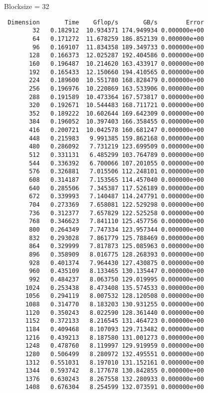 \documentclass{article}
\begin{document}
\begin{enumerate}
    Blocksize = 32
    \begin{verbatim}
 Dimension       Time    Gflop/s       GB/s        Error
        32   0.182912  10.934371 174.949934 0.000000e+00
        64   0.171272  11.678259 186.852139 0.000000e+00
        96   0.169107  11.834358 189.349733 0.000000e+00
       128   0.166373  12.025287 192.404586 0.000000e+00
       160   0.196487  10.214620 163.433917 0.000000e+00
       192   0.165433  12.150660 194.410565 0.000000e+00
       224   0.189600  10.551780 168.828479 0.000000e+00
       256   0.196976  10.220869 163.533906 0.000000e+00
       288   0.191589  10.473364 167.573817 0.000000e+00
       320   0.192671  10.544483 168.711721 0.000000e+00
       352   0.189222  10.602644 169.642309 0.000000e+00
       384   0.196052  10.397403 166.358455 0.000000e+00
       416   0.200721  10.042578 160.681247 0.000000e+00
       448   0.215983   9.991385 159.862168 0.000000e+00
       480   0.286092   7.731219 123.699509 0.000000e+00
       512   0.331131   6.485299 103.764789 0.000000e+00
       544   0.336392   6.700066 107.201055 0.000000e+00
       576   0.326881   7.015506 112.248101 0.000000e+00
       608   0.314187   7.153565 114.457040 0.000000e+00
       640   0.285506   7.345387 117.526189 0.000000e+00
       672   0.339993   7.140487 114.247791 0.000000e+00
       704   0.273369   7.658081 122.529298 0.000000e+00
       736   0.312377   7.657829 122.525258 0.000000e+00
       768   0.346623   7.841110 125.457756 0.000000e+00
       800   0.264349   7.747334 123.957344 0.000000e+00
       832   0.293028   7.861779 125.788469 0.000000e+00
       864   0.329999   7.817873 125.085963 0.000000e+00
       896   0.358909   8.016775 128.268393 0.000000e+00
       928   0.401374   7.964430 127.430875 0.000000e+00
       960   0.435109   8.133465 130.135447 0.000000e+00
       992   0.484237   8.063750 129.019995 0.000000e+00
      1024   0.253438   8.473408 135.574533 0.000000e+00
      1056   0.294119   8.007532 128.120508 0.000000e+00
      1088   0.314770   8.183203 130.931255 0.000000e+00
      1120   0.350243   8.022590 128.361440 0.000000e+00
      1152   0.372133   8.216545 131.464723 0.000000e+00
      1184   0.409468   8.107093 129.713482 0.000000e+00
      1216   0.439213   8.187580 131.001273 0.000000e+00
      1248   0.478760   8.119997 129.919959 0.000000e+00
      1280   0.506499   8.280972 132.495551 0.000000e+00
      1312   0.551031   8.197010 131.152161 0.000000e+00
      1344   0.593742   8.177678 130.842855 0.000000e+00
      1376   0.630243   8.267558 132.280933 0.000000e+00
      1408   0.676304   8.254599 132.073591 0.000000e+00

\end{verbatim}
\end{enumerate}
\end{document}
